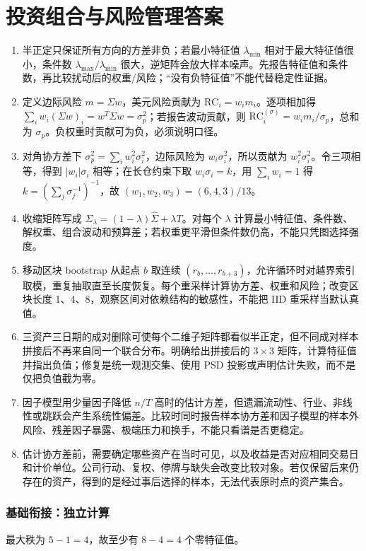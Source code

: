 \chapter{投资组合与风险管理答案}

\begin{enumerate}[leftmargin=*]
  \item 半正定只保证所有方向的方差非负；若最小特征值 $\lambda_{\min}$ 相对于最大特征值很小，条件数 $\lambda_{\max}/\lambda_{\min}$ 很大，逆矩阵会放大样本噪声。先报告特征值和条件数，再比较扰动后的权重/风险；“没有负特征值”不能代替稳定性证据。
  \item 定义边际风险 $m=\Sigma w$，美元风险贡献为 $\mathrm{RC}_i=w_im_i$。逐项相加得 $\sum_iw_i(\Sigma w)_i=w^T\Sigma w=\sigma_p^2$；若报告波动贡献，则 $\mathrm{RC}^{(\sigma)}_i=w_im_i/\sigma_p$，总和为 $\sigma_p$。负权重时贡献可为负，必须说明口径。
  \item 对角协方差下 $\sigma_p^2=\sum_iw_i^2\sigma_i^2$，边际风险为 $w_i\sigma_i^2$，所以贡献为 $w_i^2\sigma_i^2$。令三项相等，得到 $|w_i|\sigma_i$ 相等；在长仓约束下取 $w_i\sigma_i=k$，用 $\sum_iw_i=1$ 得 $k=(\sum_j\sigma_j^{-1})^{-1}$，故 $(w_1,w_2,w_3)=(6,4,3)/13$。
  \item 收缩矩阵写成 $\Sigma_\lambda=(1-\lambda)\widehat\Sigma+\lambda T$。对每个 $\lambda$ 计算最小特征值、条件数、解权重、组合波动和预算差；若权重更平滑但条件数仍高，不能只凭图选择强度。
  \item 移动区块 bootstrap 从起点 $b$ 取连续 $(r_b,\ldots,r_{b+3})$，允许循环时对越界索引取模，重复抽取直至长度恢复。每个重采样计算协方差、权重和风险；改变区块长度 1、4、8，观察区间对依赖结构的敏感性，不能把 IID 重采样当默认真值。
  \item 三资产三日期的成对删除可使每个二维子矩阵都看似半正定，但不同成对样本拼接后不再来自同一个联合分布。明确给出拼接后的 $3\times3$ 矩阵，计算特征值并指出负值；修复是统一观测交集、使用 PSD 投影或声明估计失败，而不是仅把负值截为零。
  \item 因子模型用少量因子降低 $n/T$ 高时的估计方差，但遗漏流动性、行业、非线性或跳跃会产生系统性偏差。比较时同时报告样本协方差和因子模型的样本外风险、残差因子暴露、极端压力和换手，不能只看谱是否更稳定。
  \item 估计协方差前，需要确定哪些资产在当时可见，以及收益是否对应相同交易日和计价单位。公司行动、复权、停牌与缺失会改变比较对象。若仅保留后来仍存在的资产，得到的是经过事后选择的样本，无法代表原时点的资产集合。
\end{enumerate}

\subsection*{基础衔接：独立计算}
最大秩为 $5-1=4$，故至少有 $8-4=4$ 个零特征值。
